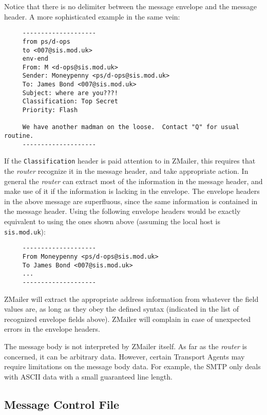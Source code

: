 Notice that there is no delimiter between the message envelope and the
message header.  A more sophisticated example in the same vein:

\begin{verbatim}
     --------------------
     from ps/d-ops
     to <007@sis.mod.uk>
     env-end
     From: M <d-ops@sis.mod.uk>
     Sender: Moneypenny <ps/d-ops@sis.mod.uk>
     To: James Bond <007@sis.mod.uk>
     Subject: where are you???!
     Classification: Top Secret
     Priority: Flash
     
     We have another madman on the loose.  Contact "Q" for usual routine.
     --------------------
\end{verbatim}


If the {\tt Classification} header is paid attention to in ZMailer, this
requires that the {\em router\/} recognize it in the message header, and take
appropriate action.  In general the {\em router\/} can extract most of the
information in the message header, and make use of it if the information is
lacking in the envelope.  The envelope headers in the above message are
superfluous, since the same information is contained in the message header.
Using the following envelope headers would be exactly equivalent to using
the ones shown above (assuming the local host is {\tt sis.mod.uk}):

\begin{verbatim}
     --------------------
     From Moneypenny <ps/d-ops@sis.mod.uk>
     To James Bond <007@sis.mod.uk>
     ...
     --------------------
\end{verbatim}


ZMailer will extract the appropriate address information from whatever the
field values are, as long as they obey the defined syntax (indicated in the
list of recognized envelope fields above).  ZMailer will complain in case
of unexpected errors in the envelope headers.

The message body is not interpreted by ZMailer itself.  As far as the
{\em router\/} is concerned, it can be arbitrary data.  However, certain Transport
Agents may require limitations on the message body data. For example, the
SMTP only deals with ASCII data with a small guaranteed line length.










\subsection{Message Control File}

